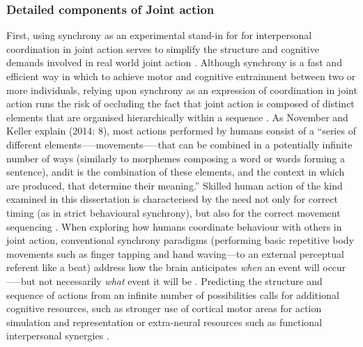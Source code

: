 \begin{CJK}{UTF8}{gbsn}
\subsubsection{Detailed components of Joint action}
First, using synchrony as an experimental stand-in for for interpersonal coordination in joint action serves to simplify the structure and cognitive demands involved in real world joint action \citep{Novembre2014}. Although synchrony is a fast and efficient way in which to achieve motor and cognitive entrainment between two or more individuals, relying upon synchrony as an expression of coordination in joint action runs the risk of occluding the fact that joint action is composed of distinct elements that are organised hierarchically within a sequence \citep{Schmidt1975,Rosenbaum2009}.  As November and Keller explain (2014: 8), most actions performed by humans consist of a ``series of different elements—--movements--—that can be combined in a potentially infinite number of ways (similarly to morphemes composing a word or words forming a sentence), and\textellipsis it is the combination of these elements, and the context in which are produced, that determine their meaning.''  Skilled human action of the kind examined in this dissertation is characterised by the need not only for correct timing (as in strict behavioural synchrony), but also for the correct movement sequencing \citep{Palmer2003}.  When exploring how humans coordinate behaviour with others in joint action, conventional synchrony paradigms (performing basic repetitive body movements such as finger tapping and hand waving---to an external perceptual referent like a beat) address how the brain anticipates \textit{when} an event will occur—--but not necessarily \textit{what} event it will be \citep{Novembre2014}.  Predicting the structure and sequence of actions from an infinite number of possibilities calls for additional cognitive resources, such as stronger use of cortical motor areas for action simulation and representation \citep{Bekkering2009} or extra-neural resources such as functional interpersonal synergies \citep{Riley2011}.


\end{CJK}
